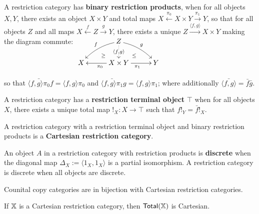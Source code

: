 \begin{definition}\cite{restiii}
A restriction category has {\bf binary restriction products}, when for all objects  $X,Y$, there exists an object $X\times Y$ and total maps $X \xleftarrow{\pi_0}  X\times Y \xrightarrow{\pi_1} Y$, so that for all objects $Z$ and all maps $X \xleftarrow{f} Z \xrightarrow{g} Y$, there exists a unique $Z\xrightarrow{\langle f,g \rangle} X\times Y$ making the diagram commute:
\hfil
$
\xymatrixrowsep{0.2cm}
\xymatrixcolsep{0.4cm}
\xymatrix{
&& Z\ar@{..>}[dd]|-{\langle f, g\rangle} \ar@/_/[ddll]_f \ar@/^/[ddrr]^g &&\\
& \ar@{}[dr]|-{\geq} && \ar@{}[dl] |-{\leq} &\\
X &&  X\times Y \ar[rr]_{\pi_1} \ar[ll]^{\pi_0}  && Y
}
$

so that $\bar{\langle f, g\rangle \pi_0} f = \langle f, g\rangle \pi_0$ and $\bar{\langle f, g\rangle \pi_1} g = \langle f, g\rangle \pi_1$;
where additionally $\bar{\langle f, g\rangle} =  \bar f \bar g$.


A restriction category has a {\bf restriction terminal object} $\top$ when for all objects $X$, there exists a unique total map $!_X:X\to\top$ such that $f !_Y = \bar f !_X$.

A restriction category with a restriction terminal object and binary restriction products is a {\bf Cartesian restriction category}.


An object $A$ in a restriction category with restriction products is {\bf discrete} when the diagonal map $\Delta_X:=\langle 1_X, 1_X\rangle$ is a partial isomorphism. A restriction category is discrete when all objects are discrete. 
\end{definition}




\begin{theorem}\cite[Thm. 5.2]{restiii}
Counital copy categories are in bijection with Cartesian restriction categories.
\end{theorem}


\begin{proposition} 
\label{prop:cartesian}
If $\mathbb{X}$ is a  Cartesian restriction category, then $\mathsf{Total}(\mathbb{X})$ is Cartesian.
\end{proposition}

